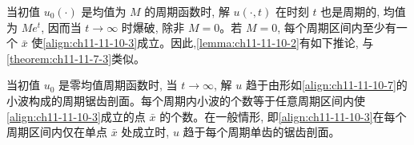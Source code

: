 \documentclass[../../main.tex]{subfiles}
\begin{document}
当初值 $u_0(\cdot)$ 是均值为 $M$ 的周期函数时, 解 $u(\cdot,t)$ 在时刻 $t$ 也是周期的, 均值为 $Me^t$, 因而当 $t\to\infty$ 时爆破, 除非 $M=0$。若 $M=0$, 每个周期区间内至少有一个 $\bar x$ 使\eqref{align:ch11-11-10-3}成立。因此,\cref{lemma:ch11-11-10-2}有如下推论, 与\cref{theorem:ch11-11-7-3}类似。

\begin{theorem}\label{theorem:ch11-11-10-3}
当初值 $u_0$ 是零均值周期函数时, 当 $t\to\infty$, 解 $u$ 趋于由形如\eqref{align:ch11-11-10-7}的小波构成的周期锯齿剖面。每个周期内小波的个数等于任意周期区间内使\eqref{align:ch11-11-10-3}成立的点 $\bar x$ 的个数。在一般情形, 即\eqref{align:ch11-11-10-3}在每个周期区间内仅在单点 $\bar x$ 处成立时, $u$ 趋于每个周期单齿的锯齿剖面。
\end{theorem}
\end{document}
